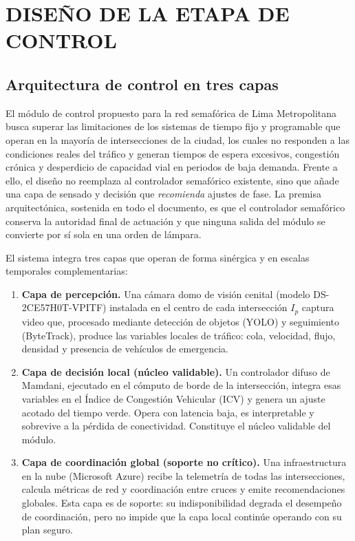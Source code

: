 \chapter{DISEÑO DE LA ETAPA DE CONTROL}\label{cap:control}

\section{Arquitectura de control en tres capas}\label{sec:arquitectura-control}

El módulo de control propuesto para la red semafórica de Lima Metropolitana busca superar
las limitaciones de los sistemas de tiempo fijo y programable que operan en la mayoría de
intersecciones de la ciudad, los cuales no responden a las condiciones reales del tráfico y
generan tiempos de espera excesivos, congestión crónica y desperdicio de capacidad vial en
periodos de baja demanda. Frente a ello, el diseño no reemplaza al controlador semafórico
existente, sino que añade una capa de sensado y decisión que \emph{recomienda} ajustes de
fase. La premisa arquitectónica, sostenida en todo el documento, es que el controlador
semafórico conserva la autoridad final de actuación y que ninguna salida del módulo se
convierte por sí sola en una orden de lámpara.

El sistema integra tres capas que operan de forma sinérgica y en escalas temporales
complementarias:

\begin{enumerate}
\item \textbf{Capa de percepción.} Una cámara domo de visión cenital (modelo
  DS-2CE57H0T-VPITF) instalada en el centro de cada intersección $I_{p}$ captura video que,
  procesado mediante detección de objetos (YOLO) y seguimiento (ByteTrack), produce las
  variables locales de tráfico: cola, velocidad, flujo, densidad y presencia de vehículos de
  emergencia.
\item \textbf{Capa de decisión local (núcleo validable).} Un controlador difuso de Mamdani,
  ejecutado en el cómputo de borde de la intersección, integra esas variables en el Índice de
  Congestión Vehicular (ICV) y genera un ajuste acotado del tiempo verde. Opera con latencia
  baja, es interpretable y sobrevive a la pérdida de conectividad. Constituye el núcleo
  validable del módulo.
\item \textbf{Capa de coordinación global (soporte no crítico).} Una infraestructura en la
  nube (Microsoft Azure) recibe la telemetría de todas las intersecciones, calcula métricas de
  red y coordinación entre cruces y emite recomendaciones globales. Esta capa es de soporte:
  su indisponibilidad degrada el desempeño de coordinación, pero no impide que la capa local
  continúe operando con su plan seguro.
\end{enumerate}

